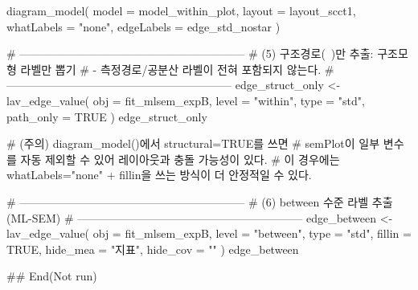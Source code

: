 \documentclass[a4paper]{book}
\begin{document}
\begin{Examples}
\begin{ExampleCode}
diagram_model(
  model      = model_within_plot,
  layout     = layout_scct1,
  whatLabels = "none",
  edgeLabels = edge_std_nostar
)

# ------------------------------------------------------------
# (5) 구조경로(~)만 추출: 구조모형 라벨만 뽑기
#     - 측정경로/공분산 라벨이 전혀 포함되지 않는다.
# ------------------------------------------------------------
edge_struct_only <- lav_edge_value(
  obj       = fit_mlsem_expB,
  level     = "within",
  type      = "std",
  path_only = TRUE
)
edge_struct_only

# (주의) diagram_model()에서 structural=TRUE를 쓰면
# semPlot이 일부 변수를 자동 제외할 수 있어 레이아웃과 충돌 가능성이 있다.
# 이 경우에는 whatLabels="none" + fillin을 쓰는 방식이 더 안정적일 수 있다.

# ------------------------------------------------------------
# (6) between 수준 라벨 추출 (ML-SEM)
# ------------------------------------------------------------
edge_between <- lav_edge_value(
  obj   = fit_mlsem_expB,
  level = "between",
  type  = "std",
  fillin   = TRUE,
  hide_mea = "지표",
  hide_cov = ""
)
edge_between

## End(Not run)
\end{ExampleCode}
\end{Examples}
\end{document}

